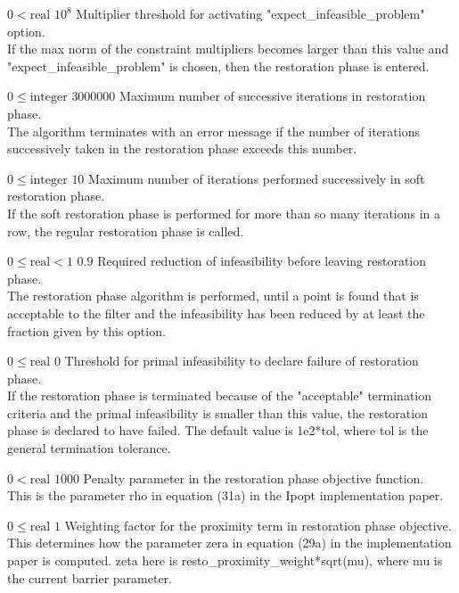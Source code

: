 %
{$0<\textrm{real}$}%
{$10^{  8}$}%
{Multiplier threshold for activating "expect\_infeasible\_problem" option.\\
If the max norm of the constraint multipliers becomes larger than this value and "expect\_infeasible\_problem" is chosen, then the restoration phase is entered.}%
{}

%
{$0\leq\textrm{integer}$}%
{$3000000$}%
{Maximum number of successive iterations in restoration phase.\\
The algorithm terminates with an error message if the number of iterations successively taken in the restoration phase exceeds this number.}%
{}

%
{$0\leq\textrm{integer}$}%
{$10$}%
{Maximum number of iterations performed successively in soft restoration phase.\\
If the soft restoration phase is performed for more than so many iterations in a row, the regular restoration phase is called.}%
{}

%
{$0\leq\textrm{real}<1$}%
{$0.9$}%
{Required reduction of infeasibility before leaving restoration phase.\\
The restoration phase algorithm is performed, until a point is found that is acceptable to the filter and the infeasibility has been reduced by at least the fraction given by this option.}%
{}

%
{$0\leq\textrm{real}$}%
{$0$}%
{Threshold for primal infeasibility to declare failure of restoration phase.\\
If the restoration phase is terminated because of the "acceptable" termination criteria and the primal infeasibility is smaller than this value, the restoration phase is declared to have failed.  The default value is 1e2*tol, where tol is the general termination tolerance.}%
{}

%
{$0<\textrm{real}$}%
{$1000$}%
{Penalty parameter in the restoration phase objective function.\\
This is the parameter rho in equation (31a) in the Ipopt implementation paper.}%
{}

%
{$0\leq\textrm{real}$}%
{$1$}%
{Weighting factor for the proximity term in restoration phase objective.\\
This determines how the parameter zera in equation (29a) in the implementation paper is computed.  zeta here is resto\_proximity\_weight*sqrt(mu), where mu is the current barrier parameter.}%
{}

